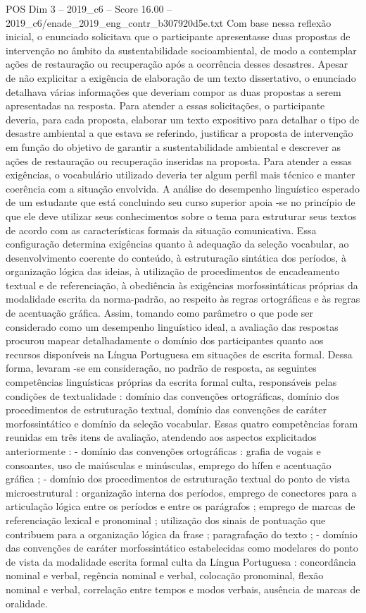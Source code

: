 \begin{textsample}{POS Dim 3 – 2019\_c6 – Score 16.00 – 2019\_c6/enade\_2019\_eng\_contr\_b307920d5e.txt}
Com base nessa reflexão inicial, o enunciado solicitava que o participante apresentasse duas propostas de intervenção no âmbito da sustentabilidade socioambiental, de modo a contemplar ações de restauração ou recuperação após a ocorrência desses desastres.
Apesar de não explicitar a exigência de elaboração de um texto dissertativo, o enunciado detalhava várias informações que deveriam compor as duas propostas a serem apresentadas na resposta.
Para atender a essas solicitações, o participante deveria, para cada proposta, elaborar um texto expositivo para detalhar o tipo de desastre ambiental a que estava se referindo, justificar a proposta de intervenção em função do objetivo de garantir a sustentabilidade ambiental e descrever as ações de restauração ou recuperação inseridas na proposta.
Para atender a essas exigências, o vocabulário utilizado deveria ter algum perfil mais técnico e manter coerência com a situação envolvida.
A análise do desempenho linguístico esperado de um estudante que está concluindo seu curso superior apoia -se no princípio de que ele deve utilizar seus conhecimentos sobre o tema para estruturar seus textos de acordo com as características formais da situação comunicativa.
Essa configuração determina exigências quanto à adequação da seleção vocabular, ao desenvolvimento coerente do conteúdo, à estruturação sintática dos períodos, à organização lógica das ideias, à utilização de procedimentos de encadeamento textual e de referenciação, à obediência às exigências morfossintáticas próprias da modalidade escrita da norma-padrão, ao respeito às regras ortográficas e às regras de acentuação gráfica.
Assim, tomando como parâmetro o que pode ser considerado como um desempenho linguístico ideal, a avaliação das respostas procurou mapear detalhadamente o domínio dos participantes quanto aos recursos disponíveis na Língua Portuguesa em situações de escrita formal.
Dessa forma, levaram -se em consideração, no padrão de resposta, as seguintes competências linguísticas próprias da escrita formal culta, responsáveis pelas condições de textualidade : domínio das convenções ortográficas, domínio dos procedimentos de estruturação textual, domínio das convenções de caráter morfossintático e domínio da seleção vocabular.
Essas quatro competências foram reunidas em três itens de avaliação, atendendo aos aspectos explicitados anteriormente : - domínio das convenções ortográficas : grafia de vogais e consoantes, uso de maiúsculas e minúsculas, emprego do hífen e acentuação gráfica ; - domínio dos procedimentos de estruturação textual do ponto de vista microestrutural : organização interna dos períodos, emprego de conectores para a articulação lógica entre os períodos e entre os parágrafos ; emprego de marcas de referenciação lexical e pronominal ; utilização dos sinais de pontuação que contribuem para a organização lógica da frase ; paragrafação do texto ; - domínio das convenções de caráter morfossintático estabelecidas como modelares do ponto de vista da modalidade escrita formal culta da Língua Portuguesa : concordância nominal e verbal, regência nominal e verbal, colocação pronominal, flexão nominal e verbal, correlação entre tempos e modos verbais, ausência de marcas de oralidade.

\end{textsample}
